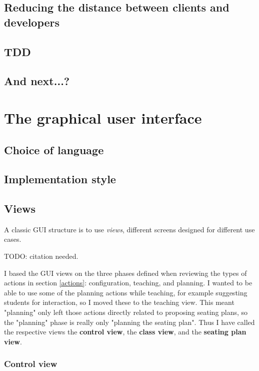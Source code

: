 \documentclass[10pt]{article}
\begin{document}
\subsection{Reducing the distance between clients and developers}

\subsection{TDD}

\subsection{And next...?}






\section{The graphical user interface} \label{gui}

\subsection{Choice of language}

\subsection{Implementation style}

\subsection{Views}
A classic GUI structure is to use \emph{views}, different screens designed for different use cases.
 
TODO: citation needed.

I based the GUI views on the three phases defined when reviewing the types of actions in section \ref{actions}: configuration, teaching, and planning. I wanted to be able to use some of the planning actions while teaching, for example suggesting students for interaction, so I moved these to the teaching view. This meant "planning" only left those actions directly related to proposing seating plans, so the "planning" phase is really only "planning the seating plan". Thus I have called the respective views the \textbf{control view}, the \textbf{class view}, and the \textbf{seating plan view}.

\subsubsection{Control view}
\end{document}
